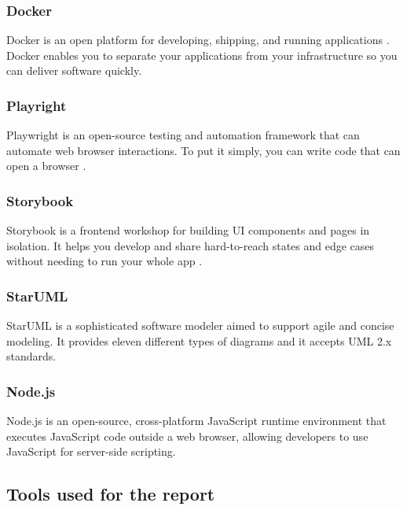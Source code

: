\subsubsection*{\protect{} Docker}

Docker is an open platform for developing, shipping, and running applications \cite{DockerArchitecture2023}. Docker enables you to separate your applications from your infrastructure so you can deliver software quickly.

\subsubsection*{\protect{} Playright}

Playwright \cite{PlaywrightDocs2023} is an open-source testing and automation framework that can automate web browser interactions. To put it simply, you can write code that can open a browser \cite{DevOpsFoundation2023}.

\subsubsection*{\protect{} Storybook}

Storybook is a frontend workshop for building UI components and pages in isolation. It helps you develop and share hard-to-reach states and edge cases without needing to run your whole app \cite{MarcotteResponsiveWebDesign2023}.

\subsubsection*{\protect{} StarUML}

StarUML \cite{StarUMLWebsite} is a sophisticated software modeler aimed to support agile and concise modeling. It provides eleven different types of diagrams and it accepts UML 2.x standards.

\subsubsection*{\protect{} Node.js}

Node.js \cite{NodeJSWebsite} is an open-source, cross-platform JavaScript runtime environment that executes JavaScript code outside a web browser, allowing developers to use JavaScript for server-side scripting.


\subsection{Tools used for the report}


